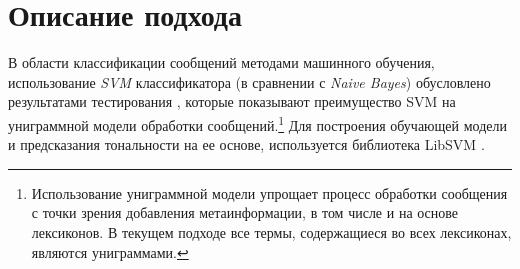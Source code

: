 \section{Описание подхода}
    \label{sec:buildingApproachDescription}
    В области классификации сообщений методами машинного обучения, использование
    {\it SVM} классификатора (в сравнении с {\it Naive Bayes}) обусловлено результатами
    тестирования \cite{svmAdvantages}, которые показывают преимущество SVM на униграммной
    модели обработки сообщений.\footnote{
        Использование униграммной модели упрощает процесс обработки сообщения с
        точки зрения добавления метаинформации, в том числе и на основе лексиконов.
        В текущем подходе все термы, содержащиеся во всех лексиконах, являются
        униграммами.
    }
    Для построения обучающей модели и предсказания
    тональности на ее основе, используется библиотека LibSVM \cite{svmClassifier}.

